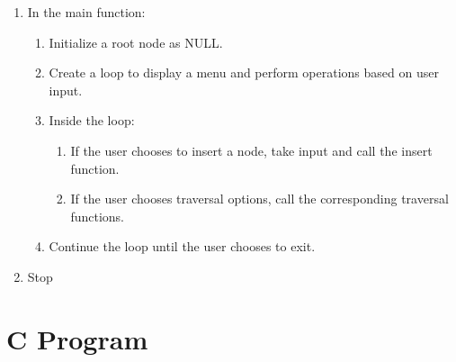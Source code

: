 {\begin{enumerate}[label=\arabic*.]
    \item In the main function:
          \begin{enumerate}[label=\arabic{enumi}.\arabic*.]
            \item Initialize a root node as NULL.
            \item Create a loop to display a menu and perform operations based on user input.
            \item Inside the loop:
                  \begin{enumerate}[label=\arabic{enumi}.\arabic{enumii}.\arabic*.]
                    \item If the user chooses to insert a node, take input and call the insert function.
                    \item If the user chooses traversal options, call the corresponding traversal functions.
                  \end{enumerate}
            \item Continue the loop until the user chooses to exit.
          \end{enumerate}

    \item Stop
  \end{enumerate}

 }
\section{C Program}

